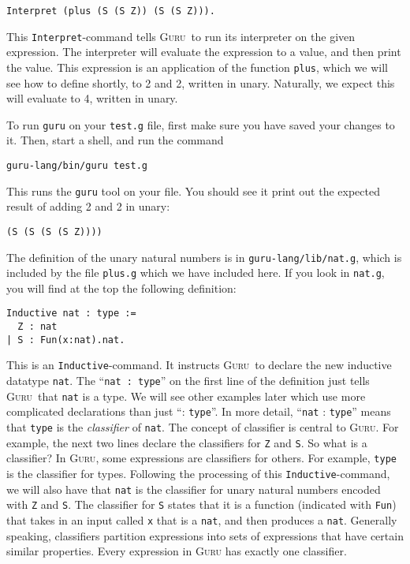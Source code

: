 \documentclass{book}[12pt]
\newcommand{\guru}[0]{\textsc{Guru}}
\begin{document}
\begin{verbatim}
Interpret (plus (S (S Z)) (S (S Z))).
\end{verbatim}

\noindent This \texttt{Interpret}-command tells \guru\ to run its
interpreter on the given expression.  The interpreter will evaluate
the expression to a value, and then print the value.  This expression
is an application of the function \texttt{plus}, which we will see how
to define shortly, to 2 and 2, written in unary.  Naturally, we expect
this will evaluate to 4, written in unary.

To run \texttt{guru} on your \texttt{test.g} file, first make sure
you have saved your changes to it.  Then, start a shell, and run
the command

\begin{verbatim}
guru-lang/bin/guru test.g
\end{verbatim}

\noindent This runs the \texttt{guru} tool on your file.  You should
see it print out the expected result of adding 2 and 2 in unary:

\begin{verbatim}
(S (S (S (S Z))))
\end{verbatim}

The definition of the unary natural numbers is in
\texttt{guru-lang/lib/nat.g}, which is included by the file
\texttt{plus.g} which we have included here.  If you look in
\texttt{nat.g}, you will find at the top the following definition:

\begin{verbatim}
Inductive nat : type :=
  Z : nat
| S : Fun(x:nat).nat.
\end{verbatim}

\noindent This is an \texttt{Inductive}-command.  It instructs \guru\
to declare the new inductive datatype \texttt{nat}.  The ``\texttt{nat
: type}'' on the first line of the definition just tells \guru\ that
\texttt{nat} is a type.  We will see other examples later which use
more complicated declarations than just ``: \texttt{type}''.  In more
detail, ``\texttt{nat} : \texttt{type}'' means that \texttt{type} is
the \emph{classifier} of \texttt{nat}.  The concept of classifier is
central to \guru.  For example, the next two lines declare the
classifiers for \texttt{Z} and \texttt{S}.  So what is a classifier?
In \guru, some expressions are classifiers for others.  For example,
\texttt{type} is the classifier for types.  Following the processing
of this \texttt{Inductive}-command, we will also have that
\texttt{nat} is the classifier for unary natural numbers encoded with
\texttt{Z} and \texttt{S}.  The classifier for \texttt{S} states that
it is a function (indicated with \texttt{Fun}) that takes in an input
called \texttt{x} that is a \texttt{nat}, and then produces a
\texttt{nat}.  Generally speaking, classifiers partition expressions
into sets of expressions that have certain similar properties.  Every
expression in \textsc{Guru} has exactly one classifier.
\end{document}
